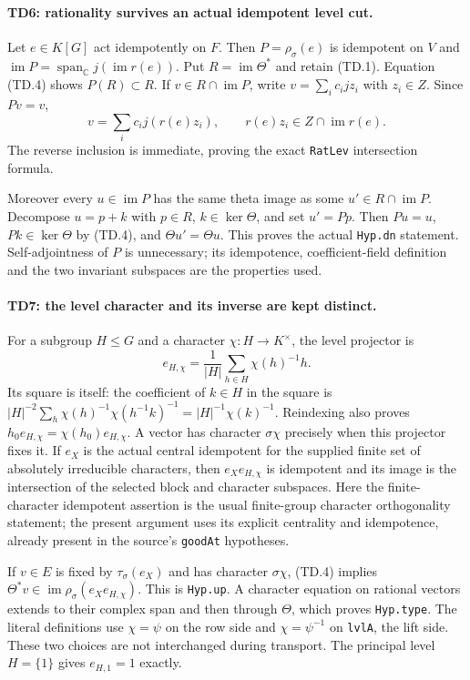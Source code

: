 \paragraph{TD6: rationality survives an actual idempotent level cut.}
Let $e\in K[G]$ act idempotently on $F$. Then $P=\rho_\sigma(e)$
is idempotent on $V$ and
$\operatorname{im}P=\operatorname{span}_{\mathbb C}j(\operatorname{im}r(e))$.
Put $R=\operatorname{im}\Theta^*$ and retain (TD.1).
Equation (TD.4) shows $P(R)\subset R$. If $v\in R\cap\operatorname{im}P$,
write $v=\sum_i c_i jz_i$ with $z_i\in Z$. Since $Pv=v$,
\[
 v=\sum_i c_i j(r(e)z_i),\qquad
 r(e)z_i\in Z\cap\operatorname{im}r(e).
\]
The reverse inclusion is immediate, proving the exact \texttt{RatLev}
intersection formula.

Moreover every $u\in\operatorname{im}P$ has the same theta image as
some $u'\in R\cap\operatorname{im}P$. Decompose $u=p+k$ with
$p\in R$, $k\in\ker\Theta$, and set $u'=Pp$. Then
$Pu=u$, $Pk\in\ker\Theta$ by (TD.4), and
$\Theta u'=\Theta u$. This proves the actual \texttt{Hyp.dn}
statement. Self-adjointness of $P$ is unnecessary; its idempotence,
coefficient-field definition and the two invariant subspaces are the
properties used.

\paragraph{TD7: the level character and its inverse are kept distinct.}
For a subgroup $H\le G$ and a character $\chi:H\to K^\times$, the
level projector is
\[
 e_{H,\chi}=\frac1{|H|}\sum_{h\in H}\chi(h)^{-1}h.
\]
Its square is itself: the coefficient of $k\in H$ in the square is
$|H|^{-2}\sum_h\chi(h)^{-1}\chi(h^{-1}k)^{-1}
=|H|^{-1}\chi(k)^{-1}$. Reindexing also proves
$h_0 e_{H,\chi}=\chi(h_0)e_{H,\chi}$.
A vector has character $\sigma\chi$ precisely when this projector
fixes it. If $e_X$ is the actual central idempotent for the supplied
finite set of absolutely irreducible characters, then
$e_Xe_{H,\chi}$ is idempotent and its image is the intersection of the
selected block and character subspaces. Here the finite-character
idempotent assertion is the usual finite-group character orthogonality
statement; the present argument uses its explicit centrality and
idempotence, already present in the source's \texttt{goodAt} hypotheses.

If $v\in E$ is fixed by $\tau_\sigma(e_X)$ and has character
$\sigma\chi$, (TD.4) implies
$\Theta^*v\in\operatorname{im}\rho_\sigma(e_Xe_{H,\chi})$.
This is \texttt{Hyp.up}. A character equation on rational vectors
extends to their complex span and then through $\Theta$, which proves
\texttt{Hyp.type}. The literal definitions use $\chi=\psi$ on the row
side and $\chi=\psi^{-1}$ on \texttt{lvlA}, the lift side. These two
choices are not interchanged during transport. The principal level
$H=\{1\}$ gives $e_{H,1}=1$ exactly.

